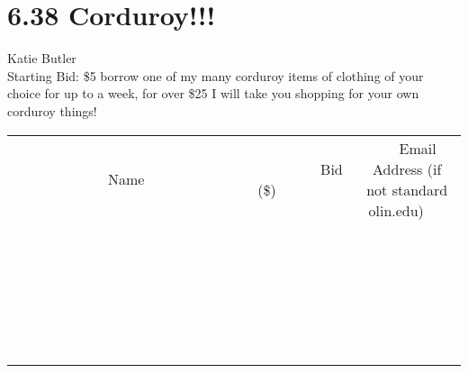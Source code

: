 \documentclass[11pt]{article}
\begin{document}
\section*{6.38 Corduroy!!!}
Katie Butler
\\
Starting Bid: \$5
\newline
borrow one of my many corduroy items of clothing of your choice for up to a week, for over \$25 I will take you shopping for your own corduroy things!
\\[6ex]
\begin{tabular}{c c c}
~~~~~~~~~~~~~Name~~~~~~~~~~~~~ & ~~~~~~~~~Bid (\$)~~~~~~~~~  & ~~~Email Address (if not standard olin.edu)~~~\\
 & & \\
\hline
 & & \\
\hline
 & & \\
\hline
 & & \\
\hline
 & & \\
\hline
 & & \\
\hline
 & & \\
\hline
 & & \\
\hline
 & & \\
\hline
 & & \\
\hline
 & & \\
\hline
 & & \\
\hline
 & & \\
\hline
 & & \\
\hline
 & & \\
\hline
 & & \\
\hline
 & & \\
\hline
 & & \\
\hline
 & & \\
\hline
 & & \\
\hline
 & & \\
\hline
 & & \\
\hline
 & & \\
\hline
 & & \\
\hline
 & & \\
\hline
 & & \\
\hline
\end{tabular}
\newpage
\end{document}
